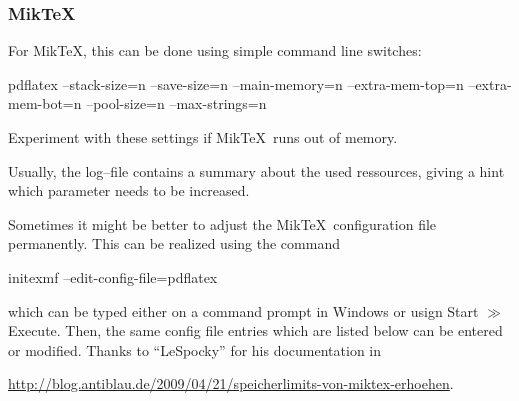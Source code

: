 \subsubsection{Mik\TeX}
For Mik\TeX, this can be done using simple command line switches:
\begin{codeexample}
pdflatex 
	--stack-size=n --save-size=n 
	--main-memory=n --extra-mem-top=n --extra-mem-bot=n
	--pool-size=n --max-strings=n 
\end{codeexample}
\noindent Experiment with these settings if Mik\TeX\ runs out of memory. 

Usually, the log--file contains a summary about the used ressources, giving a hint which parameter needs to be increased.

Sometimes it might be better to adjust the Mik\TeX\ configuration file permanently. This can be realized using the command
\begin{codeexample}
initexmf --edit-config-file=pdflatex
\end{codeexample}
\noindent which can be typed either on a command prompt in Windows or usign Start $\gg$ Execute. Then, the same config file entries which are listed below can be entered or modified. Thanks to ``LeSpocky'' for his documentation in

\url{http://blog.antiblau.de/2009/04/21/speicherlimits-von-miktex-erhoehen}.


